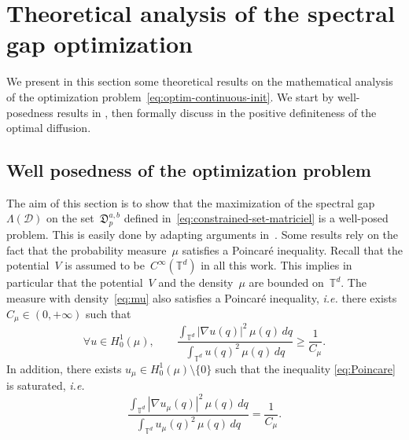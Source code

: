 \documentclass{article}
\newcommand{\dps}{\displaystyle }
\renewcommand{\geq}{\geqslant}
\def\T{\mathbb{T}}
\newcommand{\Diff}{\mathcal{D}}
\newcommand{\Diffset}{\mathfrak{D}}
\renewcommand{\dim}{d}
\begin{document}
\section{Theoretical analysis of the spectral gap optimization} 
\label{sec:scalar}

We present in this section some theoretical results on the mathematical analysis of the optimization problem~\eqref{eq:optim-continuous-init}. We start by well-posedness results in , then formally discuss in  the positive definiteness of the optimal diffusion.

\subsection{Well posedness of the optimization problem}
\label{subsec:well-posedness}

The aim of this section is to show that the maximization of the spectral gap~$\Lambda(\Diff)$ on the set~$\Diffset_p^{a,b}$ defined in~\eqref{eq:constrained-set-matriciel} is a well-posed problem. This is easily done by adapting arguments in~\cite{Henrot}. Some results rely on the fact that the probability measure~$\mu$ satisfies a Poincar\'e inequality. Recall that the potential~$V$ is assumed to be~$C^{\infty}(\T^\dim)$ in all this work. This implies in particular that the potential~$V$ and the density~$\mu$ are bounded on~$\T^\dim$. The measure with density~\eqref{eq:mu} also satisfies a Poincaré inequality, \emph{i.e.} there exists $C_{\mu} \in (0,+\infty)$ such that 
\begin{equation}
  \label{eq:Poincare}
  \forall u\in H^1_0(\mu),
  \qquad
  \frac{\dps \int_{\T^\dim}|\nabla u(q)|^2 \, \mu(q)\,dq}{\dps \int_{\T^\dim} u(q)^2 \, \mu(q) \, dq} \geq \frac{1}{C_{\mu}}.
\end{equation}
In addition, there exists $u_{\mu}\in H^1_0(\mu)\setminus \{0\}$ such that the inequality \eqref{eq:Poincare} is saturated, \emph{i.e.}
\begin{equation}
  \label{eq:Poincare-sat}
  \frac{\dps \int_{\T^\dim}|\nabla u_{\mu}(q)|^2 \, \mu(q) \, dq}{\dps \int_{\T^\dim} u_{\mu}(q)^2 \, \mu(q) \, dq} = \frac{1}{C_{\mu}}.
\end{equation}
\end{document}
